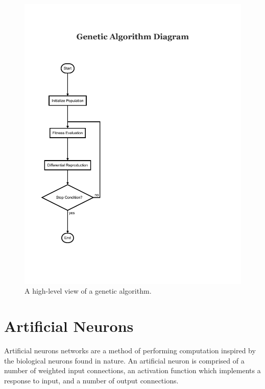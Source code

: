 \documentclass[master]{outhesis}
\begin{document}
\begin{figure}[H]
	\centering
	\includegraphics[scale=0.1]{GeneticAlgorithm.pdf}
	\caption{A high-level view of a genetic algorithm.}
\end{figure}

\section{Artificial Neurons}

Artificial neurons networks are a method of performing computation inspired by the biological neurons found in nature.
An artificial neuron is comprised of a number of weighted input connections, an activation function which implements a response to input, and a number of output connections.
\end{document}
